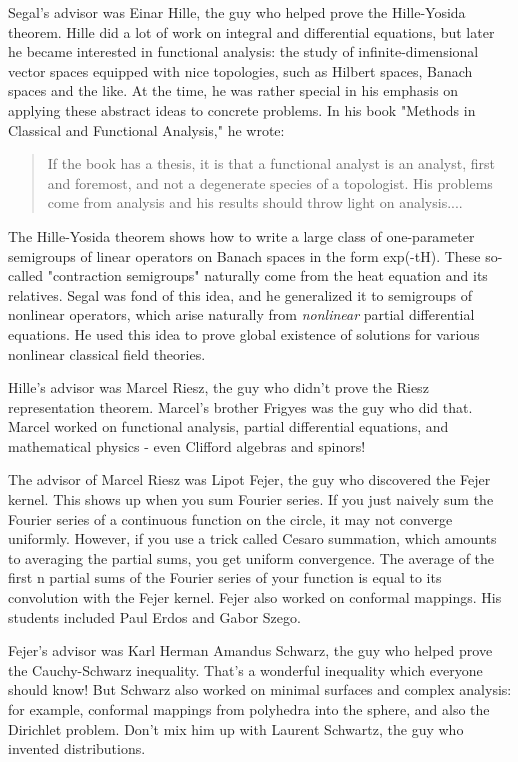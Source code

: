 Segal's advisor was Einar Hille, the guy who helped prove the
Hille-Yosida theorem.  Hille did a lot of work on integral and
differential equations, but later he became interested in functional
analysis: the study of infinite-dimensional vector spaces equipped
with nice topologies, such as Hilbert spaces, Banach spaces and the
like.  At the time, he was rather special in his emphasis on applying
these abstract ideas to concrete problems.  In his book "Methods in
Classical and Functional Analysis," he wrote:

\begin{quote}
     If the book has a thesis, it is that a functional analyst is an
     analyst, first and foremost, and not a degenerate species of a
     topologist.  His problems come from analysis and his results 
     should throw light on analysis....
\end{quote}
The Hille-Yosida theorem shows how to write a large class of
one-parameter semigroups of linear operators on Banach spaces in the
form exp(-tH).  These so-called "contraction semigroups" naturally
come from the heat equation and its relatives.  Segal was fond of this
idea, and he generalized it to semigroups of nonlinear operators,
which arise naturally from \emph{nonlinear} partial differential equations.
He used this idea to prove global existence of solutions for various
nonlinear classical field theories.

Hille's advisor was Marcel Riesz, the guy who didn't prove the Riesz
representation theorem.  Marcel's brother Frigyes was the guy who did
that.  Marcel worked on functional analysis, partial differential
equations, and mathematical physics - even Clifford algebras and
spinors!  

The advisor of Marcel Riesz was Lipot Fejer, the guy who discovered
the Fejer kernel.  This shows up when you sum Fourier series.  If you
just naively sum the Fourier series of a continuous function on the
circle, it may not converge uniformly.  However, if you use a trick
called Cesaro summation, which amounts to averaging the partial sums,
you get uniform convergence.  The average of the first n partial sums
of the Fourier series of your function is equal to its convolution
with the Fejer kernel.  Fejer also worked on conformal mappings.  His
students included Paul Erdos and Gabor Szego.

Fejer's advisor was Karl Herman Amandus Schwarz, the guy who helped
prove the Cauchy-Schwarz inequality.  That's a wonderful inequality
which everyone should know!  But Schwarz also worked on minimal
surfaces and complex analysis: for example, conformal mappings from
polyhedra into the sphere, and also the Dirichlet problem.  Don't mix
him up with Laurent Schwartz, the guy who invented distributions.

